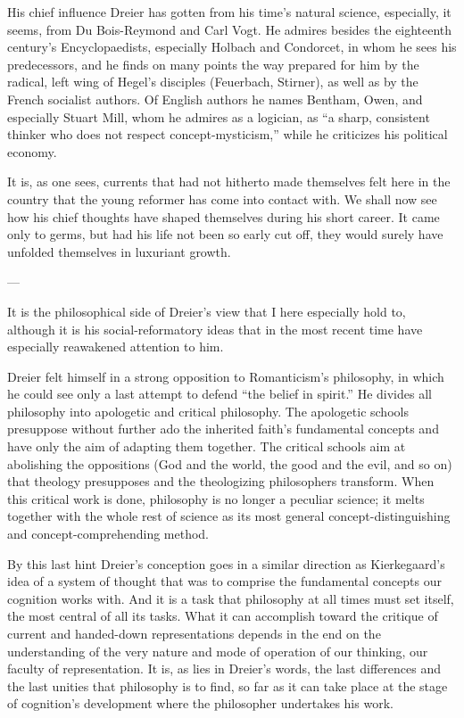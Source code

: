 \documentclass[12pt,a4paper]{book}
\newcommand{\opage}[1]{\marginnote{\footnotesize\textit{[#1]}}}
\begin{document}
His chief influence Dreier has gotten from his time's natural science, especially, it seems,
from Du Bois-Reymond and Carl Vogt. He admires besides the eighteenth century's
Encyclopaedists, especially Holbach and Condorcet, in whom he sees his predecessors, and he
finds on many points the way prepared for him by the radical, left wing of Hegel's disciples
(Feuerbach, Stirner), as well as by the French socialist authors. Of English authors he names
Bentham, Owen, and especially Stuart Mill, whom he admires as a logician, as ``a sharp,
consistent thinker who does not respect concept-mysticism,'' while he criticizes his political
economy.

It is, as one sees, currents that had not hitherto made themselves felt here in the country
that the young reformer has come into contact with. We shall now see how his chief thoughts
have shaped themselves during his short career. It came only to germs, but had his life not
been so early cut off, they would surely have unfolded themselves in luxuriant growth.

\begin{center}---\end{center}

It is the philosophical side of Dreier's view that I here especially hold to, although it is
his social-reformatory ideas that in the most recent time have especially reawakened attention
to him.

\opage{178}Dreier felt himself in a strong opposition to Romanticism's philosophy, in which he could see
only a last attempt to defend ``the belief in spirit.'' He divides all philosophy into
apologetic and critical philosophy. The apologetic schools presuppose without further ado the
inherited faith's fundamental concepts and have only the aim of adapting them together. The
critical schools aim at abolishing the oppositions (God and the world, the good and the evil,
and so on) that theology presupposes and the theologizing philosophers transform. When this
critical work is done, philosophy is no longer a peculiar science; it melts together with the
whole rest of science as its most general concept-distinguishing and concept-comprehending
method.

By this last hint Dreier's conception goes in a similar direction as Kierkegaard's idea of a
system of thought that was to comprise the fundamental concepts our cognition works with. And
it is a task that philosophy at all times must set itself, the most central of all its tasks.
What it can accomplish toward the critique of current and handed-down representations depends
in the end on the understanding of the very nature and mode of operation of our thinking, our
faculty of representation. It is, as lies in Dreier's words, the last differences and the last
unities that philosophy is to find, so far as it can take place at the stage of cognition's
development where the philosopher undertakes his work.
\end{document}
